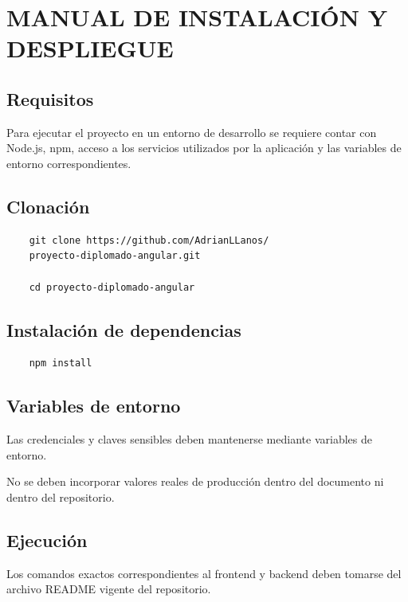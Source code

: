 
\chapter{MANUAL DE INSTALACIÓN Y DESPLIEGUE}

\section*{Requisitos}

Para ejecutar el proyecto en un entorno de desarrollo se requiere contar
con Node.js, npm, acceso a los servicios utilizados por la aplicación y las
variables de entorno correspondientes.

\section*{Clonación}

\begin{verbatim}
	git clone https://github.com/AdrianLLanos/
	proyecto-diplomado-angular.git
	
	cd proyecto-diplomado-angular
\end{verbatim}

\section*{Instalación de dependencias}

\begin{verbatim}
	npm install
\end{verbatim}

\section*{Variables de entorno}

Las credenciales y claves sensibles deben mantenerse mediante variables de
entorno.

No se deben incorporar valores reales de producción dentro del documento
ni dentro del repositorio.

\section*{Ejecución}

Los comandos exactos correspondientes al frontend y backend deben tomarse
del archivo README vigente del repositorio.

